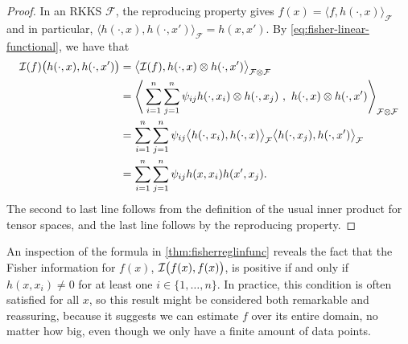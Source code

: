 \begin{proof}
  In an RKKS $\mathcal F$, the reproducing property gives $f(x) = \langle f, h(\cdot, x) \rangle_{\mathcal F}$ and in particular, $\langle h(\cdot,x), h(\cdot, x') \rangle_{\mathcal F} = h(x,x')$. 
  By \cref{eq:fisher-linear-functional}, we have that
  \begin{align*}
    {\mathcal I}(f)\big(h(\cdot,x),h(\cdot,x') \big)
    &= \big\langle {\mathcal I}(f), h(\cdot, x) \otimes h(\cdot, x') \big\rangle_{\mathcal F \otimes \mathcal F} \\
    &= \Bigg\langle \sum_{i=1}^n\sum_{j=1}^n \psi_{ij} h(\cdot,x_i) \otimes h(\cdot,x_j) \ , \ h(\cdot, x) \otimes h(\cdot, x') \Bigg\rangle_{\mathcal F \otimes \mathcal F} \\
    &= \sum_{i=1}^n\sum_{j=1}^n \psi_{ij} \big\langle h(\cdot,x_i), h(\cdot, x) \big\rangle_{\mathcal F} \big\langle h(\cdot,x_j), h(\cdot, x') \big\rangle_{\mathcal F } \\
    &= \sum_{i=1}^n\sum_{j=1}^n \psi_{ij} h(x,x_i) h(x', x_j).
  \end{align*}
  The second to last line follows from the definition of the usual inner product for tensor spaces, and the last line follows by the reproducing property.
\end{proof}

An inspection of the formula in \cref{thm:fisherreglinfunc} reveals the fact that the Fisher information for $f(x)$, ${\mathcal I} \big(f(x),f(x) \big)$, is positive if and only if $h(x,x_i)\neq 0$ for at least one $i \in \{1,\dots,n \}$.
In practice, this condition is often satisfied for all $x$, so this result might be considered both remarkable and reassuring, because it suggests we can estimate $f$ over its entire domain, no matter how big, even though we only have a finite amount of data points.
